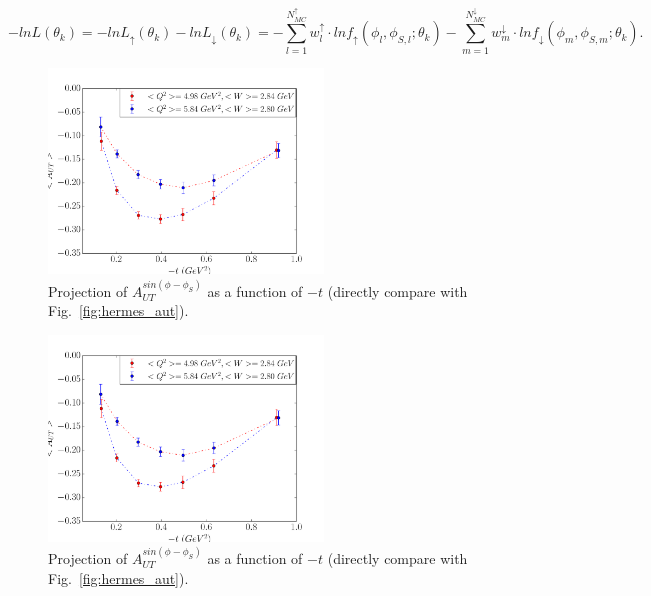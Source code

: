 \begin{equation}
  -lnL(\theta_{k}) =-ln L_{\uparrow}(\theta_{k})-lnL_{\downarrow}(\theta_{k})=-\sum_{l=1}^{N_{MC}^{\uparrow}} w^{\uparrow}_{l}\cdot lnf_{\uparrow}(\phi_{l}, \phi_{S,l};\theta_{k})-\sum_{m=1}^{N_{MC}^{\downarrow}} w^{\downarrow}_{m}\cdot lnf_{\downarrow}(\phi_{m}, \phi_{S,m};\theta_{k}).
\end{equation}

\begin{figure}[!ht]
 \begin{center}
               \includegraphics[type=pdf,
        ext=.pdf,read=.pdf,width=0.65\textwidth]{./figures/bin_asym_t_fermi_02Hz} 
      
      \caption{\footnotesize{Projection of  $A_{UT}^{sin(\phi-\phi_{S})}$ as a function of $-t$ (directly compare with
Fig.~\ref{fig:hermes_aut}).}}
  \label{asym1_t}
  \end{center}
\end{figure}
\begin{figure}[!ht]
 \begin{center}
               \includegraphics[type=pdf,
        ext=.pdf,read=.pdf,width=0.65\textwidth]{./figures/bin_asym_t_fermi_02Hz} 
        
        \caption{\footnotesize{Projection of  $A_{UT}^{sin(\phi-\phi_{S})}$ as a function of $-t$ (directly compare with
Fig.~\ref{fig:hermes_aut}).}}    
  \label{asym2_t}
  \end{center}
\end{figure}

